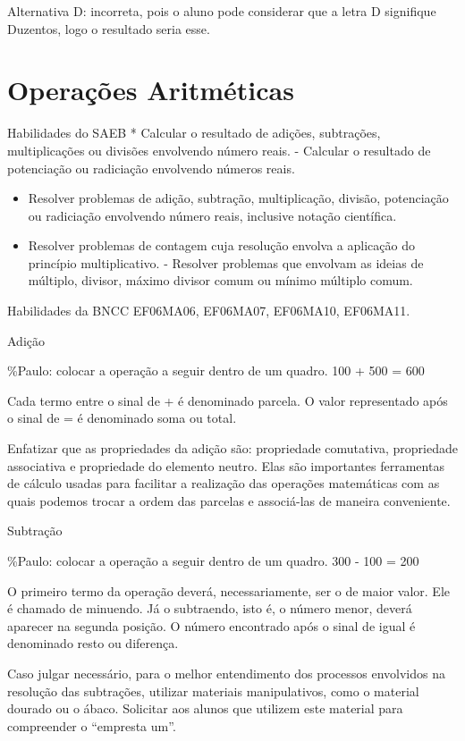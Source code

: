 Alternativa D: incorreta, pois o aluno pode considerar que a letra D
signifique Duzentos, logo o resultado seria esse.

\chapter{Operações Aritméticas}

Habilidades do SAEB * Calcular o resultado de adições, subtrações,
multiplicações ou divisões envolvendo número reais. - Calcular o
resultado de potenciação ou radiciação envolvendo números reais.

\begin{itemize}
\item
  Resolver problemas de adição, subtração, multiplicação, divisão,
  potenciação ou radiciação envolvendo número reais, inclusive notação
  científica.
\item
  Resolver problemas de contagem cuja resolução envolva a aplicação do
  princípio multiplicativo. - Resolver problemas que envolvam as ideias
  de múltiplo, divisor, máximo divisor comum ou mínimo múltiplo comum.
\end{itemize}

Habilidades da BNCC EF06MA06, EF06MA07, EF06MA10, EF06MA11.

Adição

\%Paulo: colocar a operação a seguir dentro de um quadro. 100 + 500 =
600

Cada termo entre o sinal de + é denominado parcela. O valor representado
após o sinal de = é denominado soma ou total.

Enfatizar que as propriedades da adição são: propriedade comutativa,
propriedade associativa e propriedade do elemento neutro. Elas são
importantes ferramentas de cálculo usadas para facilitar a realização
das operações matemáticas com as quais podemos trocar a ordem das
parcelas e associá-las de maneira conveniente.

Subtração

\%Paulo: colocar a operação a seguir dentro de um quadro. 300 - 100 =
200

O primeiro termo da operação deverá, necessariamente, ser o de maior
valor. Ele é chamado de minuendo. Já o subtraendo, isto é, o número
menor, deverá aparecer na segunda posição. O número encontrado após o
sinal de igual é denominado resto ou diferença.

Caso julgar necessário, para o melhor entendimento dos processos
envolvidos na resolução das subtrações, utilizar materiais
manipulativos, como o material dourado ou o ábaco. Solicitar aos alunos
que utilizem este material para compreender o ``empresta um''.

